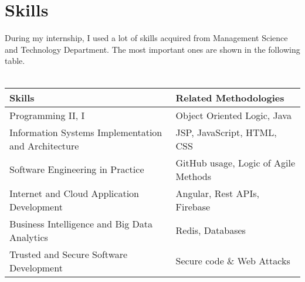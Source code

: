 
\chapter{Skills} %

\label{Chapter6}

During my internship, I used a lot of skills acquired from Management Science and Technology Department. The most important ones are shown in the following table. \\ \\

\begin{center}
	\begin{tabular}{ | p{6cm} | p{5cm} |}
		\hline
		\textbf{Skills}						& \textbf{Related Methodologies} \\[0.5cm] \hline
		
		Programming II, I 					& Object Oriented Logic, Java \\[0.2cm] \hline
		Information Systems Implementation 
		 and Architecture 					& JSP, JavaScript, HTML, CSS \\[0.2cm] \hline
		Software Engineering in Practice 	& GitHub usage, Logic of Agile Methods \\[0.2cm] \hline	
		Internet and 
			Cloud Application Development 	& Angular, Rest APIs, Firebase \\[0.2cm] \hline	
		Business Intelligence and 
		 Big Data Analytics 				& Redis, Databases \\[0.2cm] \hline
		Trusted and 
			Secure Software Development		& Secure code \& Web Attacks \\[0.2cm] \hline
	\end{tabular}
\end{center}

